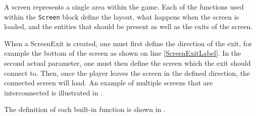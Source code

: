A screen represents a single area within the game. Each of the functions used within the \texttt{Screen} block define the layout, what happens when the screen is loaded, and the entities that should be present as well as the exits of the screen.

When a ScreenExit is created, one must first define the direction of the exit, for example the bottom of the screen as shown on line \ref{ScreenExitLabel}.
In the second actual parameter, one must then define the screen which the exit should connect to.
Then, once the player leaves the screen in the defined direction, the connected screen will load. An example of multiple screens that are interconnected is illustrated in .


The definition of each built-in function is shown in .









